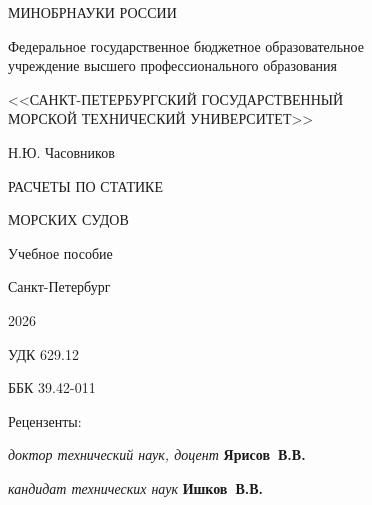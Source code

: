 \thispagestyle {empty}

\vspace{1cm}
\begin{center}
    \small
    \onehalfspacing
    { 
    МИНОБРНАУКИ РОССИИ

    Федеральное государственное бюджетное образовательное\\учреждение высшего профессионального образования

    <<САНКТ-ПЕТЕРБУРГСКИЙ ГОСУДАРСТВЕННЫЙ\\МОРСКОЙ ТЕХНИЧЕСКИЙ УНИВЕРСИТЕТ>>
    }
\end{center}

\vspace{2cm}

\begin{center}
    \onehalfspacing
    { 
    Н.Ю. Часовников
    }
\end{center}

\vspace{2cm}

\begin{center}
    \huge
    \onehalfspacing
    { 
    РАСЧЕТЫ ПО СТАТИКЕ
    
    МОРСКИХ СУДОВ
    }
\end{center}

\vspace{1cm}

\begin{center}
    \onehalfspacing
    { 
    Учебное пособие
    }
\end{center}

\vspace*{3cm}

\begin{center}
    \onehalfspacing
    { 
    Санкт-Петербург

    2026
    }
\end{center}

\newpage

\thispagestyle {empty}
УДК 629.12

ББК 39.42-011

\begin{center}
    Рецензенты:

    \vspace{0.5cm}

    \textit{доктор технический наук, доцент} \textbf{Ярисов~В.В.}

    \textit{кандидат технических наук} \textbf{Ишков~В.В.}

\end{center}

